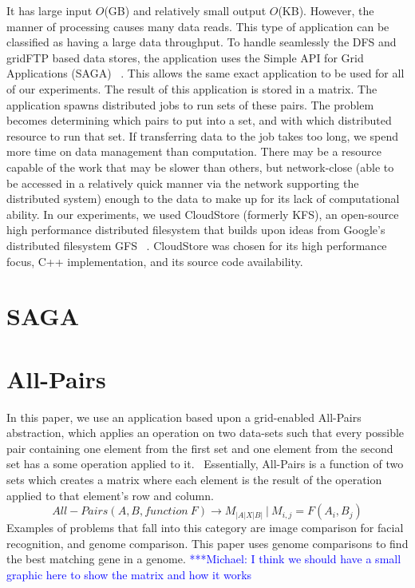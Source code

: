 \documentclass{rspublic}
\newcommand{\micnote}[1]{ {\textcolor{blue} { ***Michael: #1 }}} \else
\begin{document}
It has large input $O$(GB) and relatively small output $O$(KB).  However, the
manner of processing causes many data reads.  This type of application can be
classified as having a large data throughput.  To handle seamlessly the DFS and
gridFTP based data stores, the application uses the Simple API for Grid
Applications (SAGA) ~\citep{saga_web}.  This allows the same exact application
to be used for all of our experiments.  The result of this application is
stored in a matrix.  The application spawns distributed jobs to run sets of
these pairs.  The problem becomes determining which pairs to put into a set,
and with which distributed resource to run that set.  If transferring data to
the job takes too long, we spend more time on data management than computation.
There may be a resource capable of the work that may be slower than others, but
network-close (able to be accessed in a relatively quick manner via the network
supporting the distributed system) enough to the data to make up for its lack
of computational ability.  In our experiments, we used CloudStore (formerly
KFS), an open-source high performance distributed filesystem that builds upon
ideas from Google's distributed filesystem GFS ~\citep{cloudstore_web}.
CloudStore was chosen for its high performance focus, C++ implementation, and
its source code availability.

\section{SAGA}

\section{All-Pairs} In this paper, we use an application based upon a
grid-enabled All-Pairs abstraction, which applies an operation on two data-sets
such that every possible pair containing one element from the first set and one
element from the second set has a some operation applied to it.~\citep{Interop,
AllPairs}  Essentially, All-Pairs is a function of two sets which creates a
matrix where each element is the result of the operation applied to that
element's row and column.  \begin{equation} All-Pairs(A, B, function\ F)
\rightarrow M_{|A|X|B|}\ |\ M_{i,j} = F(A_{i},B_{j}) \end{equation} Examples of
problems that fall into this category are image comparison for facial
recognition, and genome comparison.  This paper uses genome comparisons to find
the best matching gene in a genome. \micnote{I think we should have a small
graphic here to show the matrix and how it works}
\end{document}
